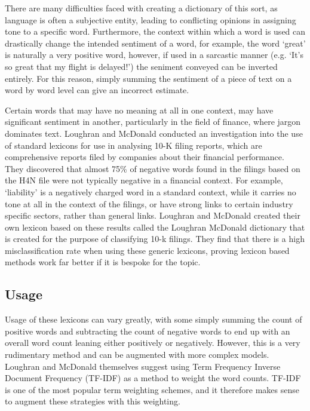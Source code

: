 There are many difficulties faced with creating a dictionary of this sort, as language is often a subjective entity, leading to conflicting opinions in assigning tone to a specific word. Furthermore, the context within which a word is used can drastically change the intended sentiment of a word, for example, the word `great' is naturally a very positive word, however, if used in a sarcastic manner (e.g. `It's so great that my flight is delayed!') the seniment conveyed can be inverted entirely. For this reason, simply summing the sentiment of a piece of text on a word by word level can give an incorrect estimate.

Certain words that may have no meaning at all in one context, may have significant sentiment in another, particularly in the field of finance, where jargon dominates text. Loughran and McDonald \cite{lm-dict} conducted an investigation into the use of standard lexicons for use in analysing 10-K filing reports, which are comprehensive reports filed by companies about their financial performance. They discovered that almost 75\% of negative words found in the filings based on the H4N file were not typically negative in a financial context. For example, `liability' is a negatively charged word in a standard context, while it carries no tone at all in the context of the filings, or have strong links to certain industry specific sectors, rather than general links. Loughran and McDonald created their own lexicon based on these results called the Loughran McDonald dictionary that is created for the purpose of classifying 10-k filings. They find that there is a high misclassification rate when using these generic lexicons, proving lexicon based methods work far better if it is bespoke for the topic. 

\subsection{Usage}
Usage of these lexicons can vary greatly, with some simply summing the count of positive words and subtracting the count of negative words to end up with an overall word count leaning either positively or negatively. However, this is a very rudimentary method and can be augmented with more complex models. Loughran and McDonald themselves suggest using Term Frequency Inverse Document Frequency (TF-IDF) as a method to weight the word counts. TF-IDF is one of the most popular term weighting schemes, and it therefore makes sense to augment these strategies with this weighting.

